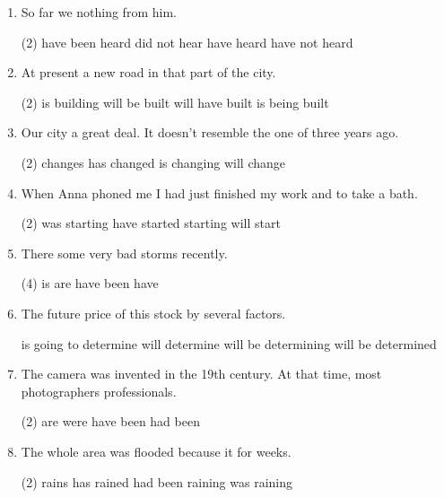 \begin{enumerate}
\item So far we \ttu nothing from him.
  \begin{tasks}(2)
    \task have been heard
    \task did not hear
    \task have heard
    \task have not heard
  \end{tasks}


\item At present a new road \ttu in that part of the city.
  \begin{tasks}(2)
    \task is building
    \task will be built
    \task will have built
    \task is being built
  \end{tasks}

\item Our city \ttu a great deal. It doesn't resemble the one of three years ago.
  \begin{tasks}(2)
    \task changes
    \task has changed
    \task is changing
    \task will change
  \end{tasks}

\item When Anna phoned me I had just finished my work and \ttu to take a bath.
  \begin{tasks}(2)
    \task was starting
    \task have started
    \task starting
    \task will start
  \end{tasks}

\item There \ttu some very bad storms recently.
  \begin{tasks}(4)
    \task is
    \task are
    \task have been
    \task have
  \end{tasks}

\item  The future price of this stock \ttu by several factors.
  \begin{tasks}
    \task is going to determine
    \task will determine
    \task will be determining
    \task will be determined
  \end{tasks}

\item The camera was invented in the 19th century. At that time, most photographers \ttu professionals.
  \begin{tasks}(2)
    \task are
    \task were
    \task have been
    \task had been
  \end{tasks}

\item The whole area was flooded because it \ttu for weeks.
  \begin{tasks}(2)
    \task rains
    \task has rained
    \task had been raining
    \task was raining
  \end{tasks}


\end{enumerate}

